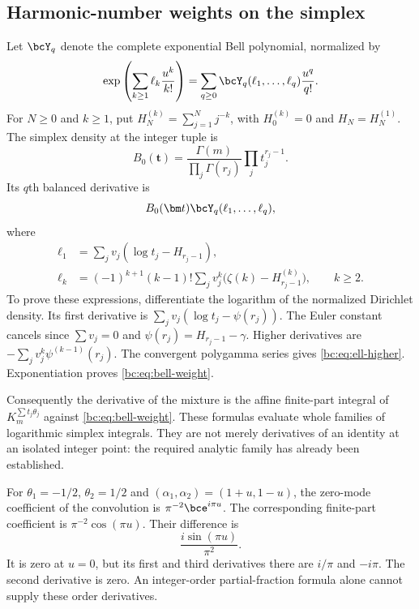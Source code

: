 \subsection{Harmonic-number weights on the simplex}

Let $\bcY_q$ denote the complete exponential Bell polynomial, normalized by
\[
 \exp\left(\sum_{k\ge1}\ell_k\frac{u^k}{k!}\right)
          =\sum_{q\ge0}\bcY_q(\ell_1,\ldots,\ell_q)\frac{u^q}{q!}.
\]
For $N\ge0$ and $k\ge1$, put
$H_N^{(k)}=\sum_{j=1}^N j^{-k}$, with $H_0^{(k)}=0$ and $H_N=H_N^{(1)}$.
The simplex density at the integer tuple is
\[
 B_0(\bm t)=\frac{\Gamma(m)}{\prod_j\Gamma(r_j)}
                             \prod_jt_j^{r_j-1}.
\]
Its $q$th balanced derivative is
\begin{equation}\label{bc:eq:bell-weight}
 B_0(\bm t)\bcY_q(\ell_1,\ldots,\ell_q),
\end{equation}
where
\begin{align}
 \ell_1&=\sum_jv_j(\log t_j-H_{r_j-1}),
       \label{bc:eq:ell-one}\\
 \ell_k&=(-1)^{k+1}(k-1)!
           \sum_jv_j^k\bigl(\zeta(k)-H_{r_j-1}^{(k)}\bigr),
                      \qquad k\ge2.
       \label{bc:eq:ell-higher}
\end{align}
To prove these expressions, differentiate the logarithm of the normalized
Dirichlet density. Its first derivative is
$\sum_jv_j(\log t_j-\psi(r_j))$. The Euler constant cancels since
$\sum v_j=0$ and $\psi(r_j)=H_{r_j-1}-\gamma$. Higher derivatives are
$-\sum_jv_j^k\psi^{(k-1)}(r_j)$. The convergent polygamma series gives
\eqref{bc:eq:ell-higher}. Exponentiation proves
\eqref{bc:eq:bell-weight}.

Consequently the derivative of the mixture is the affine finite-part
integral of $K_m^{\sum t_j\theta_j}$ against
\eqref{bc:eq:bell-weight}. These formulas evaluate whole families of
logarithmic simplex integrals. They are not merely derivatives of an
identity at an isolated integer point: the required analytic family has
already been established.

\begin{example}
For $\theta_1=-1/2$, $\theta_2=1/2$ and
$(\alpha_1,\alpha_2)=(1+u,1-u)$, the zero-mode coefficient of the
convolution is $\pi^{-2}\bce^{i\pi u}$. The corresponding finite-part
coefficient is $\pi^{-2}\cos(\pi u)$. Their difference is
\begin{equation}\label{bc:eq:jet-example}
 \frac{i\sin(\pi u)}{\pi^2}.
\end{equation}
It is zero at $u=0$, but its first and third derivatives there are
$i/\pi$ and $-i\pi$. The second derivative is zero. An integer-order
partial-fraction formula alone cannot supply these order derivatives.
\end{example}

